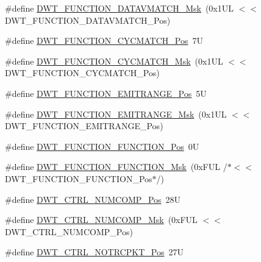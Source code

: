 \begin{DoxyCompactItemize}
\item 
\#define \hyperlink{group___c_m_s_i_s___d_w_t_ga32af1f1c0fcd2d8d9afd1ad79cd9970e}{D\+W\+T\+\_\+\+F\+U\+N\+C\+T\+I\+O\+N\+\_\+\+D\+A\+T\+A\+V\+M\+A\+T\+C\+H\+\_\+\+Msk}~(0x1\+U\+L $<$$<$ D\+W\+T\+\_\+\+F\+U\+N\+C\+T\+I\+O\+N\+\_\+\+D\+A\+T\+A\+V\+M\+A\+T\+C\+H\+\_\+\+Pos)
\item 
\#define \hyperlink{group___c_m_s_i_s___d_w_t_ga4b65d79ca37ae8010b4a726312413efd}{D\+W\+T\+\_\+\+F\+U\+N\+C\+T\+I\+O\+N\+\_\+\+C\+Y\+C\+M\+A\+T\+C\+H\+\_\+\+Pos}~7U
\item 
\#define \hyperlink{group___c_m_s_i_s___d_w_t_ga8e2ed09bdd33a8f7f7ce0444f5f3bb25}{D\+W\+T\+\_\+\+F\+U\+N\+C\+T\+I\+O\+N\+\_\+\+C\+Y\+C\+M\+A\+T\+C\+H\+\_\+\+Msk}~(0x1\+U\+L $<$$<$ D\+W\+T\+\_\+\+F\+U\+N\+C\+T\+I\+O\+N\+\_\+\+C\+Y\+C\+M\+A\+T\+C\+H\+\_\+\+Pos)
\item 
\#define \hyperlink{group___c_m_s_i_s___d_w_t_ga41d5b332216baa8d29561260a1b85659}{D\+W\+T\+\_\+\+F\+U\+N\+C\+T\+I\+O\+N\+\_\+\+E\+M\+I\+T\+R\+A\+N\+G\+E\+\_\+\+Pos}~5U
\item 
\#define \hyperlink{group___c_m_s_i_s___d_w_t_gad46dd5aba29f2e28d4d3f50b1d291f41}{D\+W\+T\+\_\+\+F\+U\+N\+C\+T\+I\+O\+N\+\_\+\+E\+M\+I\+T\+R\+A\+N\+G\+E\+\_\+\+Msk}~(0x1\+U\+L $<$$<$ D\+W\+T\+\_\+\+F\+U\+N\+C\+T\+I\+O\+N\+\_\+\+E\+M\+I\+T\+R\+A\+N\+G\+E\+\_\+\+Pos)
\item 
\#define \hyperlink{group___c_m_s_i_s___d_w_t_ga5797b556edde2bbaa4d33dcdb1a891bb}{D\+W\+T\+\_\+\+F\+U\+N\+C\+T\+I\+O\+N\+\_\+\+F\+U\+N\+C\+T\+I\+O\+N\+\_\+\+Pos}~0U
\item 
\#define \hyperlink{group___c_m_s_i_s___d_w_t_ga3b2cda708755ecf5f921d08b25d774d1}{D\+W\+T\+\_\+\+F\+U\+N\+C\+T\+I\+O\+N\+\_\+\+F\+U\+N\+C\+T\+I\+O\+N\+\_\+\+Msk}~(0x\+F\+U\+L /$\ast$$<$$<$ D\+W\+T\+\_\+\+F\+U\+N\+C\+T\+I\+O\+N\+\_\+\+F\+U\+N\+C\+T\+I\+O\+N\+\_\+\+Pos$\ast$/)
\item 
\#define \hyperlink{group___c_m_s_i_s___d_w_t_gaac44b9b7d5391a7ffef129b7f6c84cd7}{D\+W\+T\+\_\+\+C\+T\+R\+L\+\_\+\+N\+U\+M\+C\+O\+M\+P\+\_\+\+Pos}~28U
\item 
\#define \hyperlink{group___c_m_s_i_s___d_w_t_gaa3d37d68c2ba73f2026265584c2815e7}{D\+W\+T\+\_\+\+C\+T\+R\+L\+\_\+\+N\+U\+M\+C\+O\+M\+P\+\_\+\+Msk}~(0x\+F\+U\+L $<$$<$ D\+W\+T\+\_\+\+C\+T\+R\+L\+\_\+\+N\+U\+M\+C\+O\+M\+P\+\_\+\+Pos)
\item 
\#define \hyperlink{group___c_m_s_i_s___d_w_t_gaa82840323a2628e7f4a2b09b74fa73fd}{D\+W\+T\+\_\+\+C\+T\+R\+L\+\_\+\+N\+O\+T\+R\+C\+P\+K\+T\+\_\+\+Pos}~27U
\item 

\end{DoxyCompactItemize}
